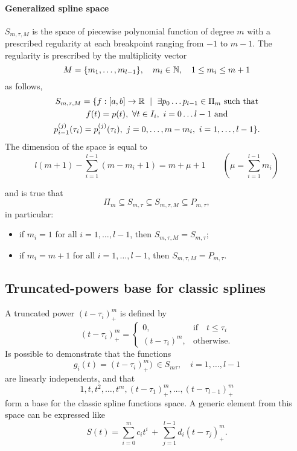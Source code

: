 \documentclass[dissertation.tex]{subfiles}
\begin{document}
\paragraph{Generalized spline space} $S_{m,\tau,M}$ is the
space of piecewise polynomial function of degree $m$ with a prescribed
regularity at each breakpoint ranging from $-1$ to $m-1$. The
regularity is prescribed by the multiplicity vector
$$
M=\{m_1,\dots,m_{l-1}\},\quad m_i\in\mathbb{N},\quad 1\leq m_i\leq m+1
$$
as follows,
\begin{multline*}
  S_{m,\tau,M}=\{f:[a,b]\rightarrow\mR\ \mid\ \exists p_0\dots
  p_{l-1}\in\Pi_m \ \text{such that}\\
  f(t)=p(t),\ \forall t\in I_i,\
  i=0\dots l-1\ \text{and}\\
  p_{i-1}^{(j)}(\tau_i)=p_{i}^{(j)}(\tau_i),\ j=0,\dots,m-m_i,\ i=1,\dots,l-1\}.
\end{multline*}
The dimension of the space is equal to 
$$
l(m+1)-\sum_{i=1}^{l-1}(m-m_i+1)=m+\mu +1\qquad(\mu=\sum_{i=1}^{l-1}m_i)
$$

and is true that
$$
\Pi_m\subseteq S_{m,\tau}\subseteq S_{m,\tau,M}\subseteq P_{m,\tau},
$$
in particular:
\begin{itemize}
  \item if $m_i=1$ for all $i=1,\dots,l-1$, then
    $S_{m,\tau,M}=S_{m,\tau}$;
  \item if $m_i=m+1$ for all $i=1,\dots,l-1$, then
    $S_{m,\tau,M}=P_{m,\tau}$.
\end{itemize}

\subsection{Truncated-powers base for classic splines}\label{sec:truncpow}
A truncated power $(t-\tau_i)_+^m$ is
defined by
$$
(t-\tau_i)_+^m=
\begin{cases}
  0,&\mbox{if}\quad t\leq\tau_i\\
  (t-\tau_i)^m, &\mbox{otherwise}.
\end{cases}
$$
Is possible to demonstrate that the functions
$$
g_i(t)=(t-\tau_i)_+^m)\ \in S_{m\tau},\quad i=1,\dots,l-1
$$
are linearly independents, and that
$$
1,t,t^2,\dots,t^m,(t-\tau_1)_+^m,\dots,(t-\tau_{l-1})_+^m
$$
form a base for the classic spline functions space. A generic element
from this space can be expressed like
\begin{equation}\label{eq:classicSplineElement}
  S(t)=\sum_{i=0}^m c_i t^i\, +\, \sum_{j=1}^{l-1} d_i (t-\tau_j)_+^m.
\end{equation}
\end{document}
